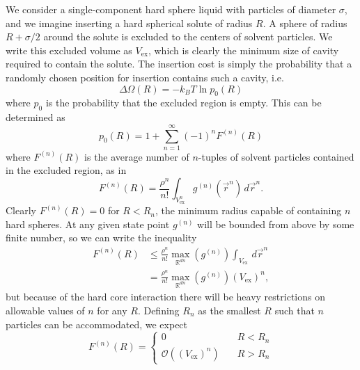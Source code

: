 \documentclass[11pt,twoside]{report}
\begin{document}
We consider a single-component hard sphere liquid with particles of diameter $\sigma$, and we imagine inserting a hard spherical solute of radius $R$.
A sphere of radius $R + \sigma/2$ around the solute is excluded to the centers of solvent particles.
We write this excluded volume as $V_\mathrm{ex}$, which is clearly the minimum size of cavity required to contain the solute.
The insertion cost is simply the probability that a randomly chosen position for insertion contains such a cavity, i.e.\
\begin{equation}\label{eq:insertion-from-p}
  \Delta \Omega(R)
  =
  -k_B T \ln p_0(R)
\end{equation}
where $p_0$ is the probability that the excluded region is empty.
This can be determined as \cite{ReissJCP1959}
\begin{equation}\label{eq:spt-zero-cavity-p}
  p_0(R) = 1 + \sum_{n=1}^\infty (-1)^n F^{(n)}(R)
\end{equation}
where $F^{(n)}(R)$ is the average number of $n$-tuples of solvent particles contained in the excluded region, as in
\begin{equation}\label{eq:spt-tuple-function}
  F^{(n)}(R)
  =
  \frac{\rho^n}{n!}
  \int_{V_\mathrm{ex}^n} g^{(n)}(\vec{r}^n) \, d\vec{r}^n.
\end{equation}
Clearly $F^{(n)}(R) = 0$ for $R < R_n$, the minimum radius capable of containing $n$ hard spheres.
At any given state point $g^{(n)}$ will be bounded from above by some finite number, so we can write the inequality
\begin{equation}\label{eq:spt-tuple-function-upper-bound}
  \begin{split}
    F^{(n)}(R) &\le
    \frac{\rho^n}{n!}
    \max_{\mathbb{R}^{dn}}{\left(g^{(n)}\right)}
    \int_{V_\mathrm{ex}} \, d\vec{r}^n \\
    &=
    \frac{\rho^n}{n!}
    \max_{\mathbb{R}^{dn}}{\left(g^{(n)}\right)}
    (V_\mathrm{ex})^n,
  \end{split}
\end{equation}
but because of the hard core interaction there will be heavy restrictions on allowable values of $n$ for any $R$.
Defining $R_n$ as the smallest $R$ such that $n$ particles can be accommodated, we expect
\begin{equation}\label{eq:F-scaling}
  F^{(n)}(R) =
  \begin{cases}
    0 & \quad R < R_n \\
    \mathcal{O}\left( \left(V_\mathrm{ex}\right)^n \right) & \quad R > R_n
  \end{cases}
\end{equation}
\end{document}
